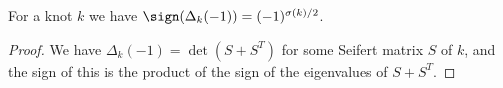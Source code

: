 \begin{exercise}
For a knot $k$ we have $\sign(\Delta_k(-1)) = (-1)^{\sigma(k)/2}$.
\end{exercise}
\begin{proof}
We have $\Delta_k(-1) = \det(S+S^T)$ for some Seifert matrix $S$ of $k$, and the sign of this is the product of the sign of the eigenvalues of $S+S^T$. 
\end{proof}







\newpage















